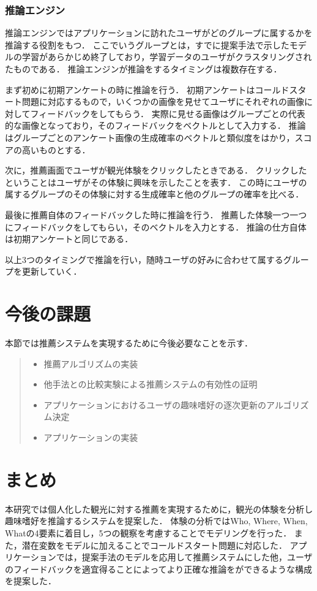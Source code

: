 \documentclass[a4j,10pt, twocolumn]{jarticle}
\begin{document}
\subsubsection{推論エンジン}
推論エンジンではアプリケーションに訪れたユーザがどのグループに属するかを推論する役割をもつ．
ここでいうグループとは，すでに提案手法で示したモデルの学習があらかじめ終了しており，学習データのユーザがクラスタリングされたものである．
推論エンジンが推論をするタイミングは複数存在する．

まず初めに初期アンケートの時に推論を行う．
初期アンケートはコールドスタート問題に対応するもので，いくつかの画像を見せてユーザにそれぞれの画像に対してフィードバックをしてもらう．
実際に見せる画像はグループごとの代表的な画像となっており，そのフィードバックをベクトルとして入力する．
推論はグループごとのアンケート画像の生成確率のベクトルと類似度をはかり，スコアの高いものとする．

次に，推薦画面でユーザが観光体験をクリックしたときである．
クリックしたということはユーザがその体験に興味を示したことを表す．
この時にユーザの属するグループのその体験に対する生成確率と他のグループの確率を比べる．

最後に推薦自体のフィードバックした時に推論を行う．
推薦した体験一つ一つにフィードバックをしてもらい，そのベクトルを入力とする．
推論の仕方自体は初期アンケートと同じである．

以上3つのタイミングで推論を行い，随時ユーザの好みに合わせて属するグループを更新していく．


\section{今後の課題} \label{future_work}
本節では推薦システムを実現するために今後必要なことを示す．

\begin{quote}
  \begin{itemize}
    \item 推薦アルゴリズムの実装
    \item 他手法との比較実験による推薦システムの有効性の証明
    \item アプリケーションにおけるユーザの趣味嗜好の逐次更新のアルゴリズム決定
    \item アプリケーションの実装
  \end{itemize}
\end{quote}

\section{まとめ} \label{summary}
本研究では個人化した観光に対する推薦を実現するために，観光の体験を分析し趣味嗜好を推論するシステムを提案した．
体験の分析ではWho, Where, When, Whatの4要素に着目し，5つの観察を考慮することでモデリングを行った．
また，潜在変数をモデルに加えることでコールドスタート問題に対応した．
アプリケーションでは，提案手法のモデルを応用して推薦システムにした他，ユーザのフィードバックを適宜得ることによってより正確な推論をができるような構成を提案した．



\end{document}
